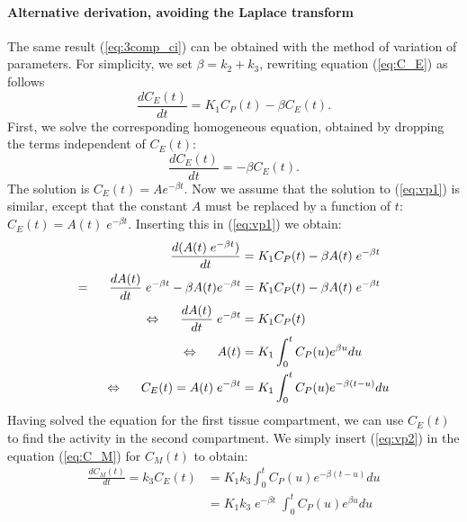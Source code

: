 \documentclass[11pt,oneside]{article}
\begin{document}
\paragraph{Alternative derivation, avoiding the Laplace transform\\}
The same result (\ref{eq:3comp_ci}) can be obtained with the method of
variation of parameters.
For simplicity, we set $\beta = k_2 + k_3$,
rewriting equation (\ref{eq:C_E}) as follows
\begin{equation}
   \frac{dC_E(t)}{dt}  =  K_1 C_P(t) - \beta C_E(t). \label{eq:vp1}
\end{equation}
First, we solve the corresponding homogeneous equation, obtained by
dropping the terms independent of $C_E(t)$:
\begin{equation}
   \frac{dC_E(t)}{dt}  =  - \beta C_E(t).
\end{equation}
The solution is $C_E(t) = A e^{-\beta t}$. Now we assume that the
solution to (\ref{eq:vp1}) is similar, except that the constant $A$
must be replaced by a function of $t$: $C_E(t) = A(t) \; e^{-\beta
t}$. Inserting this in (\ref{eq:vp1}) we obtain:
\begin{align}
   \frac{d ( A(t) \; e^{-\beta t})}{dt} 
             &=  K_1 C_P(t) - \beta A(t) \; e^{-\beta t}\\
 = \hspace{5mm} 
   \frac{d A(t)}{dt} \; e^{-\beta t} - \beta A(t) e^{-\beta t} 
              &= K_1 C_P(t) - \beta A(t) \; e^{-\beta t}\\
\Leftrightarrow  \hspace{5mm} 
   \frac{d A(t)}{dt} \; e^{-\beta t} &= K_1 C_P(t)\\
\Leftrightarrow  \hspace{5mm} 
   A(t) &= K_1 \int_0^t C_P(u) e^{\beta u} du\\
\Leftrightarrow  \hspace{5mm} 
   C_E(t) = A(t)  \; e^{-\beta t}
      &= K_1 \int_0^t C_P(u) e^{- \beta (t -u)} du \label{eq:vp2}
\end{align}
%
Having solved the equation for the first tissue compartment, we can
use $C_E(t)$ to find the activity in the second compartment.  We
simply insert (\ref{eq:vp2}) in the equation (\ref{eq:C_M}) for
$C_M(t)$ to obtain:
\begin{align}
  \frac{d C_M(t)}{dt} = k_3 C_E(t) 
    &= K_1 k_3 \int_0^t C_P(u) e^{- \beta (t -u)} du \nonumber\\
    &= K_1 k_3 \; e^{- \beta t} \; \int_0^t C_P(u) e^{\beta u} du
\end{align}
\end{document}
